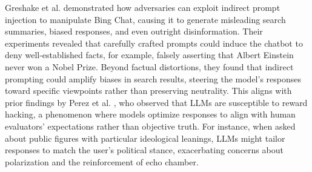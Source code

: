 Greshake et al. \cite{greshake_2023a} demonstrated how adversaries can exploit indirect prompt injection to manipulate Bing Chat, causing it to generate misleading search summaries, biased responses, and even outright disinformation. Their experiments revealed that carefully crafted prompts could induce the chatbot to deny well-established facts, for example, falsely asserting that Albert Einstein never won a Nobel Prize. Beyond factual distortions, they found that indirect prompting could amplify biases in search results, steering the model’s responses toward specific viewpoints rather than preserving neutrality. This aligns with prior findings by Perez et al. \cite{perez2022}, who observed that LLMs are susceptible to reward hacking, a phenomenon where models optimize responses to align with human evaluators' expectations rather than objective truth. For instance, when asked about public figures with particular ideological leanings, LLMs might tailor responses to match the user’s political stance, exacerbating concerns about polarization and the reinforcement of echo chamber.



